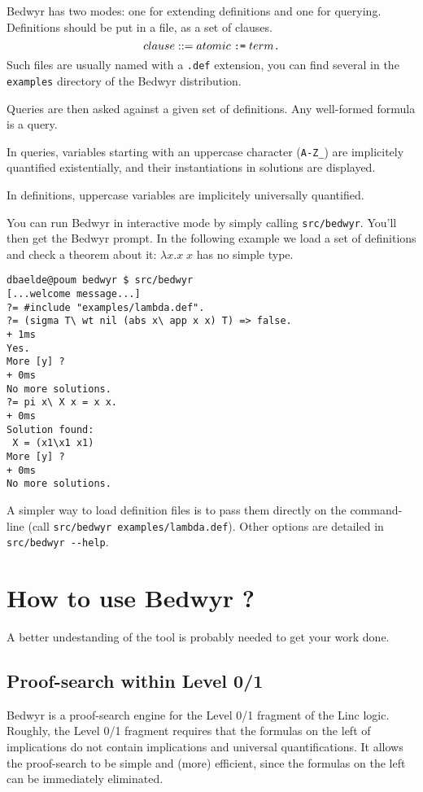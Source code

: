 \documentclass{article}
\begin{document}
Bedwyr has two modes: one for extending definitions and one for querying.
Definitions should be put in a file, as a set of clauses.
\[ clause ::= atomic \;\verb.:=.\; term \verb|.| \]
Such files are usually named with a \verb|.def| extension, you can find several
in the \verb.examples. directory of the Bedwyr distribution.

Queries are then asked against a given set of definitions.
Any well-formed formula is a query.

In queries, variables starting with an uppercase character (\verb.A-Z_.)
are implicitely quantified existentially, and their instantiations in solutions
are displayed.

In definitions, uppercase variables are implicitely universally quantified.

You can run Bedwyr in interactive mode by simply calling \texttt{src/bedwyr}.
You'll then get the Bedwyr prompt. In the following example we load a set of 
definitions and check a theorem about it: $\lambda x.x\;x$ has no simple type.

\begin{verbatim}
dbaelde@poum bedwyr $ src/bedwyr
[...welcome message...]
?= #include "examples/lambda.def".
?= (sigma T\ wt nil (abs x\ app x x) T) => false.
+ 1ms
Yes.
More [y] ?
+ 0ms
No more solutions.
?= pi x\ X x = x x.
+ 0ms
Solution found:
 X = (x1\x1 x1)
More [y] ?
+ 0ms
No more solutions.
\end{verbatim}

A simpler way to load definition files is to pass them directly on the
command-line (call \verb|src/bedwyr examples/lambda.def|).
Other options are detailed in \verb.src/bedwyr --help..

\newpage
\section{How to use Bedwyr ?}
\label{sec:howto}

A better undestanding of the tool is probably needed to get your work done.

\subsection{Proof-search within Level 0/1}

Bedwyr is a proof-search engine for the Level 0/1 fragment of the Linc logic.
Roughly, the Level 0/1 fragment requires that the formulas on the left of
implications do not contain implications and universal quantifications.
It allows the proof-search to be simple and (more) efficient,
since the formulas on the left can be immediately eliminated.
\end{document}
